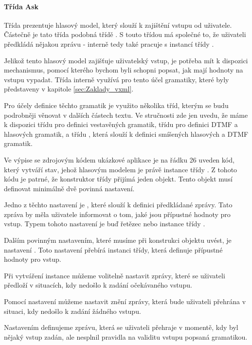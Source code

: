 \documentclass[ing,male,java,dept460]{diploma}						%
\begin{document}
\paragraph{Třída Ask}
\label{sec:Ask}
Třída  prezentuje hlasový model, který slouží k zajištění vstupu od uživatele. Částečně je tato třída podobná třídě . S touto třídou má společné to, že uživateli předkládá nějakou zprávu - interně tedy také pracuje s instancí třídy .

Jelikož tento hlasový model zajišťuje uživatelský vstup, je potřeba mít k dispozici mechanismus, pomocí kterého bychom byli schopni popsat, jak mají hodnoty na vstupu vypadat. Třída interně využívá pro tento účel gramatiky, které byly představeny v kapitole \ref{sec:Zaklady_vxml}.

Pro účely definice těchto gramatik je využito několika tříd, kterým se budu podrobněji věnovat v dalších částech textu. Ve stručnosti zde jen uvedu, že máme k dispozici třídu  pro definici vestavěných gramatik, třídu  pro definici DTMF a hlasových gramatik, a třídu , která slouží k definici smíšených hlasových a DTMF gramatik.

Ve výpise se zdrojovým kódem ukázkové aplikace je na řádku 26 uveden kód, který vytváří stav, jehož hlasovým modelem je právě instance třídy . Z tohoto kódu je patrné, že konstruktor třídy přijímá jeden objekt. Tento objekt musí definovat minimálně dvě povinná nastavení.

Jedno z těchto nastavení je , které slouží k definici předkládané zprávy. Tato zpráva by měla uživatele informovat o tom, jaké jsou přípustné hodnoty pro vstup. Typem tohoto nastavení je buď řetězec nebo instance třídy .

Dalším povinným nastavením, které musíme při konstrukci objektu uvést, je nastavení . Toto nastavení přebírá instanci třídy, která definuje přípustné hodnoty pro vstup.

Při vytváření instance můžeme volitelně nastavit zprávy, které se uživateli předloží v situacích, kdy nedošlo k zadání očekávaného vstupu.

Pomocí nastavení  můžeme nastavit znění zprávy, která bude uživateli přehrána v situaci, kdy nedošlo k zadání žádného vstupu.

Nastavením  definujeme zprávu, která se uživateli přehraje v momentě, kdy byl nějaký vstup zadán, ale nesplnil pravidla na validitu vstupu popsaná gramatikou.
\end{document}
